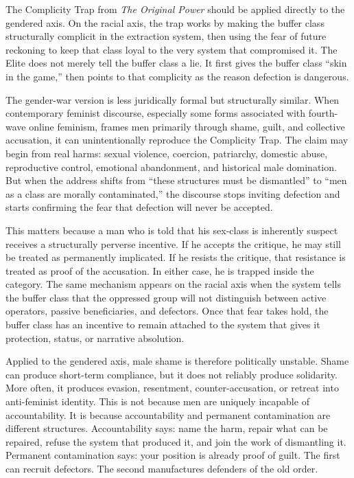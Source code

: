 \documentclass[12pt]{article}
\newcommand{\OP}{\textit{The Original Power}}
\begin{document}
The Complicity Trap from \OP{} should be applied directly to the gendered axis. On the racial axis, the trap works by making the buffer class structurally complicit in the extraction system, then using the fear of future reckoning to keep that class loyal to the very system that compromised it. The Elite does not merely tell the buffer class a lie. It first gives the buffer class ``skin in the game,'' then points to that complicity as the reason defection is dangerous.

The gender-war version is less juridically formal but structurally similar. When contemporary feminist discourse, especially some forms associated with fourth-wave online feminism, frames men primarily through shame, guilt, and collective accusation, it can unintentionally reproduce the Complicity Trap. The claim may begin from real harms: sexual violence, coercion, patriarchy, domestic abuse, reproductive control, emotional abandonment, and historical male domination. But when the address shifts from ``these structures must be dismantled'' to ``men as a class are morally contaminated,'' the discourse stops inviting defection and starts confirming the fear that defection will never be accepted.

This matters because a man who is told that his sex-class is inherently suspect receives a structurally perverse incentive. If he accepts the critique, he may still be treated as permanently implicated. If he resists the critique, that resistance is treated as proof of the accusation. In either case, he is trapped inside the category. The same mechanism appears on the racial axis when the system tells the buffer class that the oppressed group will not distinguish between active operators, passive beneficiaries, and defectors. Once that fear takes hold, the buffer class has an incentive to remain attached to the system that gives it protection, status, or narrative absolution.

Applied to the gendered axis, male shame is therefore politically unstable. Shame can produce short-term compliance, but it does not reliably produce solidarity. More often, it produces evasion, resentment, counter-accusation, or retreat into anti-feminist identity. This is not because men are uniquely incapable of accountability. It is because accountability and permanent contamination are different structures. Accountability says: name the harm, repair what can be repaired, refuse the system that produced it, and join the work of dismantling it. Permanent contamination says: your position is already proof of guilt. The first can recruit defectors. The second manufactures defenders of the old order.
\end{document}
